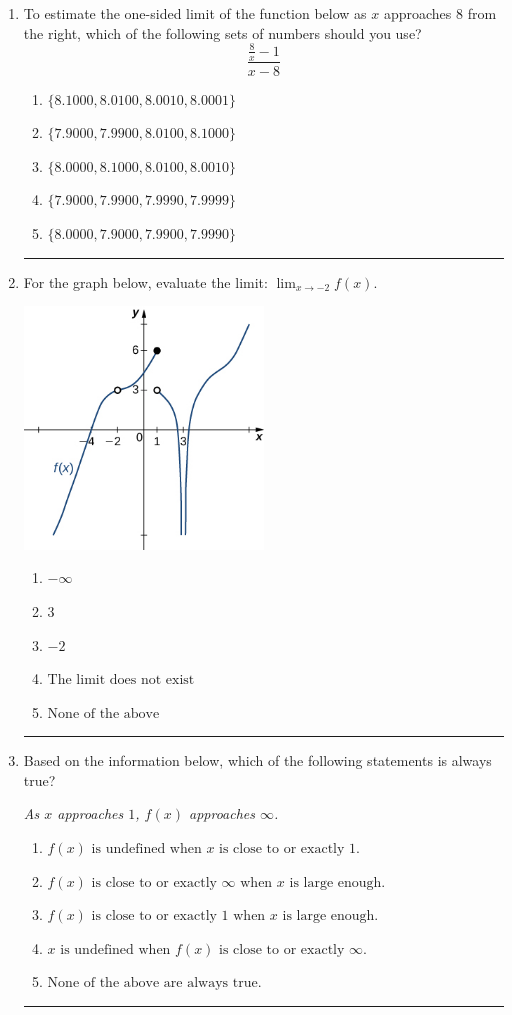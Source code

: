 \documentclass[14pt]{extbook}
\newcommand{\litem}[1]{\item#1\hspace*{-1cm}\rule{\textwidth}{0.4pt}}
\begin{document}
\begin{enumerate}
{\begin{enumerate}[label=\Alph*.]
\end{enumerate} }
\litem{
To estimate the one-sided limit of the function below as $x$ approaches 8 from the right, which of the following sets of numbers should you use?\[ \frac{\frac{8}{x} - 1}{x - 8} \]\begin{enumerate}[label=\Alph*.]
\item \( \{ 8.1000, 8.0100, 8.0010, 8.0001 \} \)
\item \( \{ 7.9000, 7.9900, 8.0100, 8.1000 \} \)
\item \( \{ 8.0000, 8.1000, 8.0100, 8.0010 \} \)
\item \( \{ 7.9000, 7.9900, 7.9990, 7.9999 \} \)
\item \( \{ 8.0000, 7.9000, 7.9900, 7.9990 \} \)

\end{enumerate} }
\litem{
For the graph below, evaluate the limit: $ \displaystyle \lim_{x \rightarrow -2} f(x)$.
\begin{center}
    \includegraphics[width=0.5\textwidth]{../Figures/evaluateLimitGraphicallyA.png}
\end{center}
\begin{enumerate}[label=\Alph*.]
\item \( -\infty \)
\item \( 3 \)
\item \( -2 \)
\item \( \text{The limit does not exist} \)
\item \( \text{None of the above} \)

\end{enumerate} }
\litem{
Based on the information below, which of the following statements is always true?
\begin{center}
    \textit{ As $x$ approaches $1$, $f(x)$ approaches $\infty$. }
\end{center}
\begin{enumerate}[label=\Alph*.]
\item \( f(x) \text{ is undefined when } x \text{ is close to or exactly } 1. \)
\item \( f(x) \text{ is close to or exactly } \infty \text{ when } x \text{ is large enough}. \)
\item \( f(x) \text{ is close to or exactly } 1 \text{ when } x \text{ is large enough}. \)
\item \( x \text{ is undefined when } f(x) \text{ is close to or exactly } \infty. \)
\item \( \text{None of the above are always true.} \)


\end{enumerate}}
\end{enumerate}
\end{document}
